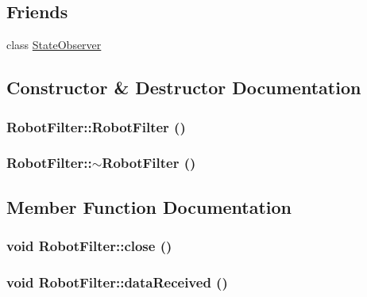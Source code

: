 \subsection*{Friends}
\begin{DoxyCompactItemize}
\item 
class \hyperlink{class_robot_filter_a298aa88af98a8b88e7f9a11ded16a587}{StateObserver}
\end{DoxyCompactItemize}


\subsection{Constructor \& Destructor Documentation}
\hypertarget{class_robot_filter_ac8b34c364fc76fedb9f44ab6c551b8fd}{
\subsubsection[{RobotFilter}]{\setlength{\rightskip}{0pt plus 5cm}RobotFilter::RobotFilter ()}}
\label{class_robot_filter_ac8b34c364fc76fedb9f44ab6c551b8fd}
\hypertarget{class_robot_filter_a023b1465a80479e54bd4a47ca958a5af}{
\subsubsection[{$\sim$RobotFilter}]{\setlength{\rightskip}{0pt plus 5cm}RobotFilter::$\sim$RobotFilter ()}}
\label{class_robot_filter_a023b1465a80479e54bd4a47ca958a5af}


\subsection{Member Function Documentation}
\hypertarget{class_robot_filter_af727d2bba23531237fdd21ac198a4726}{
\subsubsection[{close}]{\setlength{\rightskip}{0pt plus 5cm}void RobotFilter::close ()}}
\label{class_robot_filter_af727d2bba23531237fdd21ac198a4726}
\hypertarget{class_robot_filter_a98520b2362e5f41732c0ce9ea06ec1a7}{
\subsubsection[{dataReceived}]{\setlength{\rightskip}{0pt plus 5cm}void RobotFilter::dataReceived ()}}
\label{class_robot_filter_a98520b2362e5f41732c0ce9ea06ec1a7}


